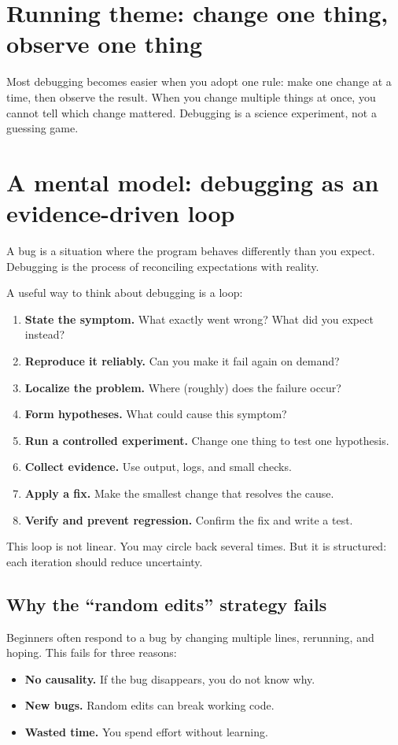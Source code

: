 \section*{Running theme: change one thing, observe one thing}
Most debugging becomes easier when you adopt one rule: make one change at a time, then observe the result. When you change multiple things at once, you cannot tell which change mattered. Debugging is a science experiment, not a guessing game.

\section{A mental model: debugging as an evidence-driven loop}
A bug is a situation where the program behaves differently than you expect. Debugging is the process of reconciling expectations with reality.

A useful way to think about debugging is a loop:
\begin{enumerate}[noitemsep]
  \item \textbf{State the symptom.} What exactly went wrong? What did you expect instead?
  \item \textbf{Reproduce it reliably.} Can you make it fail again on demand?
  \item \textbf{Localize the problem.} Where (roughly) does the failure occur?
  \item \textbf{Form hypotheses.} What could cause this symptom?
  \item \textbf{Run a controlled experiment.} Change one thing to test one hypothesis.
  \item \textbf{Collect evidence.} Use output, logs, and small checks.
  \item \textbf{Apply a fix.} Make the smallest change that resolves the cause.
  \item \textbf{Verify and prevent regression.} Confirm the fix and write a test.
\end{enumerate}

This loop is not linear. You may circle back several times. But it is structured: each iteration should reduce uncertainty.

\subsection{Why the ``random edits'' strategy fails}
Beginners often respond to a bug by changing multiple lines, rerunning, and hoping. This fails for three reasons:
\begin{itemize}[noitemsep]
  \item \textbf{No causality.} If the bug disappears, you do not know why.
  \item \textbf{New bugs.} Random edits can break working code.
  \item \textbf{Wasted time.} You spend effort without learning.
\end{itemize}

